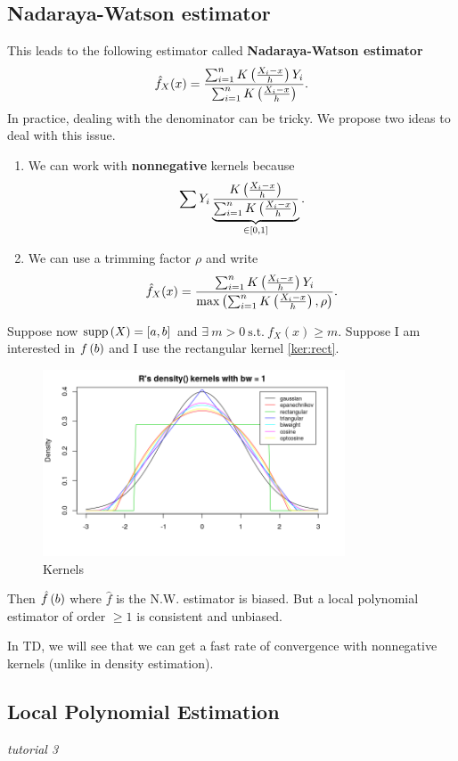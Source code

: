 \subsection{Nadaraya-Watson estimator}
This leads to the following estimator called \textbf{Nadaraya-Watson estimator}
$$\hat{f}_X(x) = \frac{\sum_{i=1}^n K\left(\frac{X_i-x}{h}\right)Y_i}{\sum_{i=1}^n
        K\left(\frac{X_i-x}{h}\right)}.$$ In practice, dealing with the denominator can be
tricky. We propose two ideas to deal with this issue.
\begin{enumerate}
    \item We can work with \textbf{nonnegative} kernels because \begin{equation*}
              \sum Y_i \underbrace{\frac{K\left(\frac{X_i-x}{h}\right)}{\sum_{i=1}^n K\left(\frac{X_i-x}{h}\right)}}_{\in \left[0,1\right]}.
          \end{equation*}
    \item We can use a trimming factor $\rho$ and write $$\hat{f}_X(x) =
              \frac{\sum_{i=1}^n K\left(\frac{X_i-x}{h}\right)Y_i}{\max\left(\sum_{i=1}^n
                      K\left(\frac{X_i-x}{h}\right),\rho\right)}.$$
\end{enumerate}
Suppose now $\text{supp}\left(X\right)=[a,b]$ and $\exists\ m>0\ \text{s.t.}\ f_X(x)\ge m$. Suppose I am interested in $f\left(b\right)$ and I use the rectangular kernel \ref{ker:rect}.
\begin{figure}[!h]
    \centering
    \includegraphics[width=0.8\textwidth]{figures/kernels.png}
    \caption{Kernels}
\end{figure}
Then $\hat{f}\left(b\right)$ where $\hat{f}$ is the N.W. estimator is biased. But a local polynomial estimator of order $\ge 1$ is consistent and unbiased.
\begin{remark}
    In TD, we will see that we can get a fast rate of convergence with nonnegative kernels (unlike in density estimation).
\end{remark}
\subsection{Local Polynomial Estimation}
\textit{tutorial 3}
